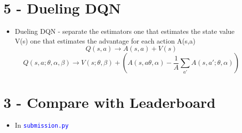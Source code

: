 \documentclass[12pt]{article}
\begin{document}
\section*{5 - Dueling DQN }
 \begin{itemize}
\item Dueling DQN - separate the estimators
one that estimates the state value V(s)
one that estimates the advantage for each action A(s,a)
\begin{equation}
Q(s,a) \rightarrow A(s,a) + V(s)
\end{equation}
\begin{equation}
Q(s,a; \theta, \alpha, \beta) \rightarrow V(s; \theta, \beta) + (A(s,a\theta, \alpha) - \frac{1}{A} \sum_{a'}^{} A(s,a';\theta,\alpha ))
\end{equation}
\end{itemize}

\section*{3 - Compare with Leaderboard}
\begin{itemize}
\item In \textcolor{blue}{\texttt{submission.py}}
\end{itemize}
\end{document}
